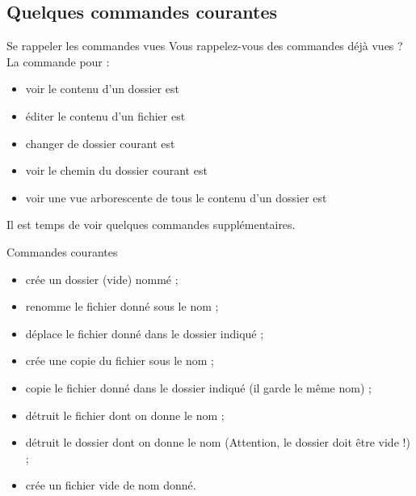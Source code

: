 \documentclass[a4paper,11pt]{style-esi/td}
\begin{document}
	\subsection{Quelques commandes courantes}

		\begin{Exercice}{Se rappeler les commandes vues}		
			Vous rappelez-vous des commandes déjà vues ?
			La commande pour :
			\begin{itemize}
			\item voir le contenu d'un dossier est  
			\item éditer le contenu d'un fichier est  
			\item changer de dossier courant est  
			\item voir le chemin du dossier courant est  
			\item voir une vue arborescente de tous le contenu d'un dossier est  
			\end{itemize}
		\end{Exercice}

		\bigskip
		Il est temps de voir quelques commandes supplémentaires.

		\begin{theorie}{Commandes courantes}
			\begin{itemize}
			\item {}
				crée un dossier (vide) nommé  ;
			\item {} 
				renomme le fichier donné  sous le nom  ;
			\item {}
				déplace le fichier donné dans le dossier indiqué ;
			\item {} 
				crée une copie du fichier sous le nom  ;
			\item {} copie le fichier donné dans le dossier indiqué 
				(il garde le même nom) ;
			\item {} détruit le fichier dont on donne le nom ;
			\item {} détruit le dossier dont on donne le nom 
				(Attention, le dossier doit être vide !) ;
			\item {} crée un fichier vide de nom donné.
			\end{itemize}
		\end{theorie}
\end{document}
